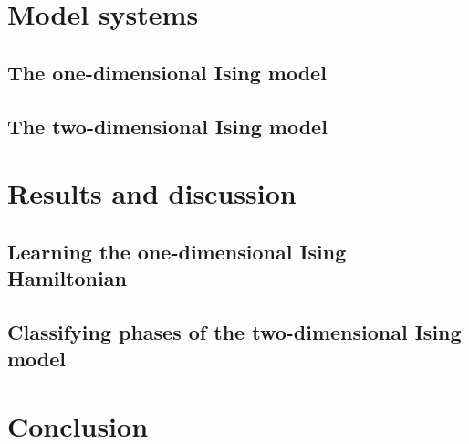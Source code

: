 \documentclass[a4paper, twocolumn]{article}
\begin{document}
\section{Model systems}
\lipsum[5]
\subsection{The one-dimensional Ising model}
\lipsum[6]
\subsection{The two-dimensional Ising model}
\lipsum[7]
\section{Results and discussion}
\lipsum[8]
\subsection{Learning the one-dimensional Ising Hamiltonian}
\lipsum[9]
\subsection{Classifying phases of the two-dimensional Ising model}
\lipsum[10]
\section{Conclusion}
\lipsum[11]

\onecolumn{
\printbibliography
}
\end{document}
